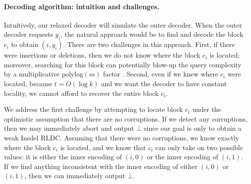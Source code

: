 \documentclass[10pt,a4paper]{article}
\theoremstyle{remark}
\newcommand{\polylog}{\ensuremath{\mathrm{polylog}}\xspace}
\begin{document}
\paragraph{Decoding algorithm: intuition and challenges.}
Intuitively, our relaxed decoder will simulate the outer decoder. 
When the outer decoder requests $y_i$, the natural approach would be to find and decode the block $c_i$ to obtain $(i,y_i)$. 
There are two challenges in this approach. 
First, if there were insertions or deletions, then we do not know where the block $c_i$ is located; moreover, searching for this block can potentially blow-up the query complexity by a multiplicative $\polylog(m)$ factor \cite{Ostrovsky-InsdelLDC-Compiler,BlockBGKZ20}. 
Second, even if we knew where $c_i$ were located, because $t = O(\log k)$ and we want the decoder to have constant locality, we cannot afford to recover the entire block $c_i$. 

We address the first challenge by attempting to locate block $c_i$ under the optimistic assumption that there are no corruptions. 
If we detect any corruptions, then we may immediately abort and output $\bot$ since our goal is only to obtain a weak Insdel RLDC. 
Assuming that there were no corruptions, we know exactly where the block $c_i$ is located, and we know that $c_i$ can only take on two possible values: it is either the inner encoding of $(i,0)$ or the inner encoding of $(i,1)$. 
If we find anything inconsistent with the inner encoding of either $(i,0)$ or $(i,1)$, then we can immediately output $\bot$.
\end{document}
